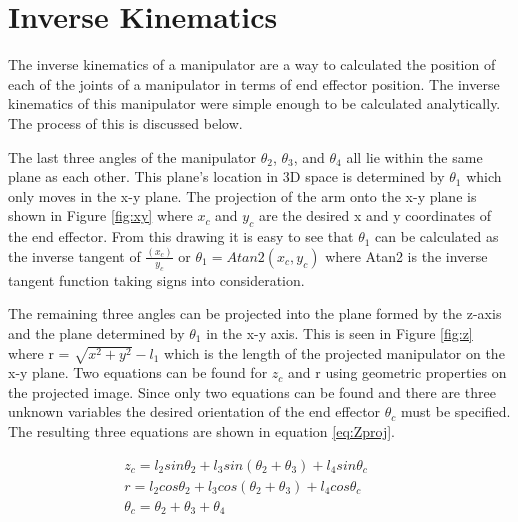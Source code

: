 \section{Inverse Kinematics}
The inverse kinematics of a manipulator are a way to calculated the position of each of the joints of a manipulator in terms of end effector position. The inverse kinematics of this manipulator were simple enough to be calculated analytically. The process of this is discussed below.

The last three angles of the manipulator $\theta_2$, $\theta_3$, and $\theta_4$ all lie within the same plane as each other. This plane's location in 3D space is determined by $\theta_1$ which only moves in the x-y plane. The projection of the arm onto the x-y plane is shown in Figure \ref{fig:xy} where $x_c$ and $y_c$ are the desired x and y coordinates of the end effector. From this drawing it is easy to see that $\theta_1$ can be calculated as the inverse tangent of $\frac{(x_c)}{y_c}$ or $\theta_1 = Atan2(x_c,y_c)$ where Atan2 is the inverse tangent function taking signs into consideration.

The remaining three angles can be projected into the plane formed by the z-axis and the plane determined by $\theta_1$ in the x-y axis. This is seen in Figure \ref{fig:z} where r = $\sqrt{x^2+y^2} - l_1$ which is the length of the projected manipulator on the x-y plane. Two equations can be found for $z_c$ and r using geometric properties on the projected image. Since only two equations can be found and there are three unknown variables the desired orientation of the end effector $\theta_c$ must be specified. The resulting three equations are shown in equation \ref{eq:Zproj}.

\begin{subequations}
\label{eq:Zproj}
	\begin{align}
	z_c = l_2sin\theta_2+l_3sin(\theta_2+\theta_3) + l_4sin\theta_c\qquad \\
	r = l_2cos\theta_2+l_3cos(\theta_2+\theta_3) + l_4cos\theta_c\qquad \\
	\theta_c = \theta_2 + \theta_3 + \theta_4 \qquad 
	\end{align}
\end{subequations}

